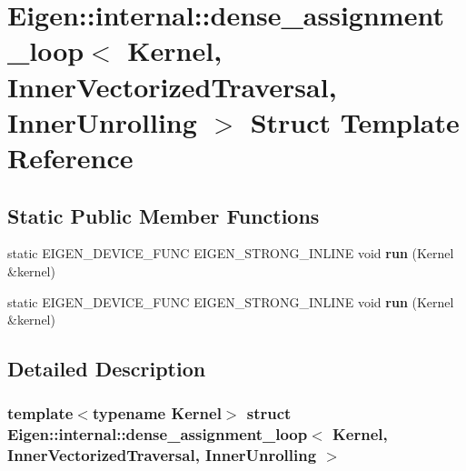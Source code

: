 \hypertarget{struct_eigen_1_1internal_1_1dense__assignment__loop_3_01_kernel_00_01_inner_vectorized_traversal_00_01_inner_unrolling_01_4}{}\section{Eigen\+:\+:internal\+:\+:dense\+\_\+assignment\+\_\+loop$<$ Kernel, Inner\+Vectorized\+Traversal, Inner\+Unrolling $>$ Struct Template Reference}
\label{struct_eigen_1_1internal_1_1dense__assignment__loop_3_01_kernel_00_01_inner_vectorized_traversal_00_01_inner_unrolling_01_4}
\subsection*{Static Public Member Functions}
\begin{DoxyCompactItemize}
\item 
\mbox{\label{struct_eigen_1_1internal_1_1dense__assignment__loop_3_01_kernel_00_01_inner_vectorized_traversal_00_01_inner_unrolling_01_4_a43950b1d4d1f69b5eba0a3b5a5cd0ff1}} 
static E\+I\+G\+E\+N\+\_\+\+D\+E\+V\+I\+C\+E\+\_\+\+F\+U\+NC E\+I\+G\+E\+N\+\_\+\+S\+T\+R\+O\+N\+G\+\_\+\+I\+N\+L\+I\+NE void {\bfseries run} (Kernel \&kernel)
\item 
\mbox{\label{struct_eigen_1_1internal_1_1dense__assignment__loop_3_01_kernel_00_01_inner_vectorized_traversal_00_01_inner_unrolling_01_4_a43950b1d4d1f69b5eba0a3b5a5cd0ff1}} 
static E\+I\+G\+E\+N\+\_\+\+D\+E\+V\+I\+C\+E\+\_\+\+F\+U\+NC E\+I\+G\+E\+N\+\_\+\+S\+T\+R\+O\+N\+G\+\_\+\+I\+N\+L\+I\+NE void {\bfseries run} (Kernel \&kernel)
\end{DoxyCompactItemize}


\subsection{Detailed Description}
\subsubsection*{template$<$typename Kernel$>$\newline
struct Eigen\+::internal\+::dense\+\_\+assignment\+\_\+loop$<$ Kernel, Inner\+Vectorized\+Traversal, Inner\+Unrolling $>$}



